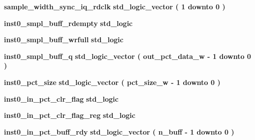 \begin{DoxyCompactItemize}
\item 
{\bf sample\+\_\+width\+\_\+sync\+\_\+iq\+\_\+rdclk} {\bfseries \textcolor{comment}{std\+\_\+logic\+\_\+vector}\textcolor{vhdlchar}{ }\textcolor{vhdlchar}{(}\textcolor{vhdlchar}{ }\textcolor{vhdlchar}{ } \textcolor{vhdldigit}{1} \textcolor{vhdlchar}{ }\textcolor{keywordflow}{downto}\textcolor{vhdlchar}{ }\textcolor{vhdlchar}{ } \textcolor{vhdldigit}{0} \textcolor{vhdlchar}{ }\textcolor{vhdlchar}{)}\textcolor{vhdlchar}{ }} 
\item 
{\bf inst0\+\_\+smpl\+\_\+buff\+\_\+rdempty} {\bfseries \textcolor{comment}{std\+\_\+logic}\textcolor{vhdlchar}{ }} 
\item 
{\bf inst0\+\_\+smpl\+\_\+buff\+\_\+wrfull} {\bfseries \textcolor{comment}{std\+\_\+logic}\textcolor{vhdlchar}{ }} 
\item 
{\bf inst0\+\_\+smpl\+\_\+buff\+\_\+q} {\bfseries \textcolor{comment}{std\+\_\+logic\+\_\+vector}\textcolor{vhdlchar}{ }\textcolor{vhdlchar}{(}\textcolor{vhdlchar}{ }\textcolor{vhdlchar}{ }\textcolor{vhdlchar}{ }\textcolor{vhdlchar}{ }{\bfseries {\bf out\+\_\+pct\+\_\+data\+\_\+w}} \textcolor{vhdlchar}{-\/}\textcolor{vhdlchar}{ } \textcolor{vhdldigit}{1} \textcolor{vhdlchar}{ }\textcolor{keywordflow}{downto}\textcolor{vhdlchar}{ }\textcolor{vhdlchar}{ } \textcolor{vhdldigit}{0} \textcolor{vhdlchar}{ }\textcolor{vhdlchar}{)}\textcolor{vhdlchar}{ }} 
\item 
{\bf inst0\+\_\+pct\+\_\+size} {\bfseries \textcolor{comment}{std\+\_\+logic\+\_\+vector}\textcolor{vhdlchar}{ }\textcolor{vhdlchar}{(}\textcolor{vhdlchar}{ }\textcolor{vhdlchar}{ }\textcolor{vhdlchar}{ }\textcolor{vhdlchar}{ }{\bfseries {\bf pct\+\_\+size\+\_\+w}} \textcolor{vhdlchar}{-\/}\textcolor{vhdlchar}{ } \textcolor{vhdldigit}{1} \textcolor{vhdlchar}{ }\textcolor{keywordflow}{downto}\textcolor{vhdlchar}{ }\textcolor{vhdlchar}{ } \textcolor{vhdldigit}{0} \textcolor{vhdlchar}{ }\textcolor{vhdlchar}{)}\textcolor{vhdlchar}{ }} 
\item 
{\bf inst0\+\_\+in\+\_\+pct\+\_\+clr\+\_\+flag} {\bfseries \textcolor{comment}{std\+\_\+logic}\textcolor{vhdlchar}{ }} 
\item 
{\bf inst0\+\_\+in\+\_\+pct\+\_\+clr\+\_\+flag\+\_\+reg} {\bfseries \textcolor{comment}{std\+\_\+logic}\textcolor{vhdlchar}{ }} 
\item 
{\bf inst0\+\_\+in\+\_\+pct\+\_\+buff\+\_\+rdy} {\bfseries \textcolor{comment}{std\+\_\+logic\+\_\+vector}\textcolor{vhdlchar}{ }\textcolor{vhdlchar}{(}\textcolor{vhdlchar}{ }\textcolor{vhdlchar}{ }\textcolor{vhdlchar}{ }\textcolor{vhdlchar}{ }{\bfseries {\bf n\+\_\+buff}} \textcolor{vhdlchar}{-\/}\textcolor{vhdlchar}{ } \textcolor{vhdldigit}{1} \textcolor{vhdlchar}{ }\textcolor{keywordflow}{downto}\textcolor{vhdlchar}{ }\textcolor{vhdlchar}{ } \textcolor{vhdldigit}{0} \textcolor{vhdlchar}{ }\textcolor{vhdlchar}{)}\textcolor{vhdlchar}{ }} 

\end{DoxyCompactItemize}
